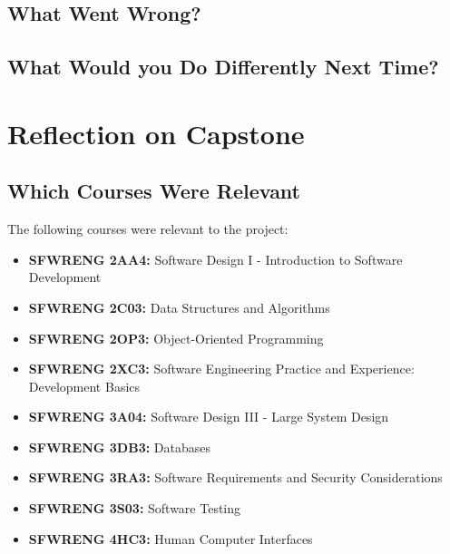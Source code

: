 \documentclass{article}
\begin{document}
\subsection{What Went Wrong?}


\subsection{What Would you Do Differently Next Time?}


\section{Reflection on Capstone}


\subsection{Which Courses Were Relevant}
The following courses were relevant to the project:
\begin{itemize}
  \item \textbf{SFWRENG 2AA4:} Software Design I - Introduction to
    Software Development
  \item \textbf{SFWRENG 2C03:} Data Structures and Algorithms
  \item \textbf{SFWRENG 2OP3:} Object-Oriented Programming
  \item \textbf{SFWRENG 2XC3:} Software Engineering Practice and
    Experience: Development Basics
  \item \textbf{SFWRENG 3A04:} Software Design III - Large System Design
  \item \textbf{SFWRENG 3DB3:} Databases
  \item \textbf{SFWRENG 3RA3:} Software Requirements and Security Considerations
  \item \textbf{SFWRENG 3S03:} Software Testing
  \item \textbf{SFWRENG 4HC3:} Human Computer Interfaces
\end{itemize}
\end{document}
